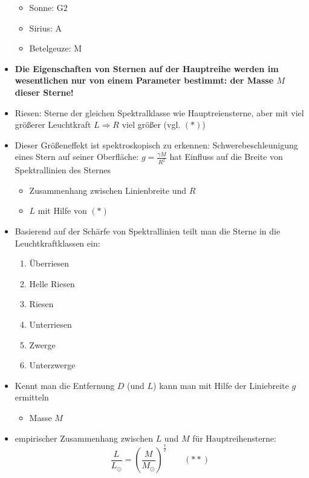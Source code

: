 \begin{itemize}
		\begin{itemize}[label={}]
			\item Sonne: G2
			\item Sirius: A
			\item Betelgeuze: M
		\end{itemize}
	\item \textbf{Die Eigenschaften von Sternen auf der Hauptreihe werden im wesentlichen nur von einem Parameter bestimmt: der Masse $M$ dieser Sterne!}
	\item Riesen: Sterne der gleichen Spektralklasse wie Hauptreiensterne, aber mit viel größerer Leuchtkraft $L\Rightarrow R$ viel größer (vgl. $(\ast)$)
	\item Dieser Größeneffekt ist spektroskopisch zu erkennen: Schwerebeschleunigung eines Stern auf seiner Oberfläche: $g=\frac{\gamma M}{R^2}$ hat Einfluss auf die Breite von Spektrallinien des Sternes
		\begin{itemize}
			\item Zusammenhang zwischen Linienbreite und $R$ 
			\item $L$ mit Hilfe von $(\ast)$
		\end{itemize}
	\item Basierend auf der Schärfe von Spektrallinien teilt man die Sterne in die Leuchtkraftklassen ein:
		\begin{enumerate}[label={\Roman*:}]
			\item Überriesen
			\item Helle Riesen
			\item Riesen
			\item Unterriesen
			\item Zwerge
			\item Unterzwerge
		\end{enumerate}
	\item Kennt man die Entfernung $D$ (und $L$) kann man mit Hilfe der Liniebreite $g$ ermitteln
		\begin{itemize}
			\item Masse $M$
		\end{itemize}
	\item empirischer Zusammenhang zwischen $L$ und $M$ für Hauptreihensterne:
		\begin{equation*}
			\frac{L}{L_\odot}=\left(\frac{M}{M_\odot}\right)^\frac{7}{2} \qquad (\ast\ast)
		\end{equation*}
\end{itemize}
